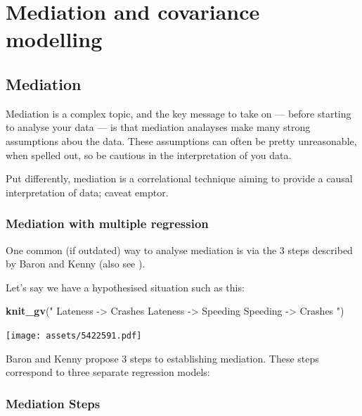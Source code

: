 \documentclass[]{article}
\newenvironment{Shaded}{\begin{snugshade}}{\end{snugshade}}
\newcommand{\KeywordTok}[1]{\textcolor[rgb]{0.13,0.29,0.53}{\textbf{#1}}}
\newcommand{\NormalTok}[1]{#1}
\newcommand{\StringTok}[1]{\textcolor[rgb]{0.31,0.60,0.02}{#1}}
\begin{document}
\hypertarget{mediation-and-covariance-modelling}{%
\section{Mediation and covariance modelling}\label{mediation-and-covariance-modelling}}

\hypertarget{mediation}{%
\subsection*{Mediation}\label{mediation}}

Mediation is a complex topic, and the key message to take on --- before starting
to analyse your data --- is that mediation analayses make many strong assumptions
abou the data. These assumptions can often be pretty unreasonable, when spelled
out, so be cautious in the interpretation of you data.

Put differently, mediation is a correlational technique aiming to provide a
causal interpretation of data; caveat emptor.

\hypertarget{mediation-with-multiple-regression}{%
\subsubsection*{Mediation with multiple regression}\label{mediation-with-multiple-regression}}

One common (if outdated) way to analyse mediation is via the 3 steps described
by Baron and Kenny \citeyearpar{baron1986moderator} (also see \citet{zhao_reconsidering_2010}).

Let's say we have a hypothesised situation such as this:

\begin{Shaded}
\begin{Highlighting}[]
\KeywordTok{knit_gv}\NormalTok{(}\StringTok{"}
\StringTok{Lateness -> Crashes}
\StringTok{Lateness -> Speeding}
\StringTok{Speeding -> Crashes}
\StringTok{"}\NormalTok{)}
\end{Highlighting}
\end{Shaded}

\texttt{[image: assets/5422591.pdf]}

Baron and Kenny propose 3 steps to establishing mediation. These steps
correspond to three separate regression models:

\hypertarget{mediation-steps}{%
\subsubsection*{Mediation Steps}\label{mediation-steps}}
\end{document}
